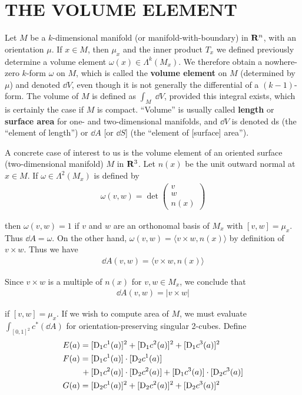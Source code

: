 \clearpage
\section{THE VOLUME ELEMENT}
Let $M$ be a $k$-dimensional manifold (or manifold-with-boundary) in $\mathbf{R}^n$, 
with an orientation $\mu$. If $x\in M$, then $\mu_x$ and the inner product $T_x$ we defined 
previously determine a volume element $\omega(x) \in \Lambda^k(M_x)$. We therefore obtain a 
nowhere-zero $k$-form $\omega$ on $M$, which is called the \textbf{volume element} on $M$ 
(determined by $\mu$) and denoted $\dd V$, even though it is not generally the differential 
of a $(k-1)$-form. The volume of $M$ is defined as $\int_M \;\dd V$, provided this integral 
exists, which is certainly the case if $M$ is compact. ``Volume'' is usually called \textbf{length} or 
\textbf{surface area} for one- and two-dimensional manifolds, and $\dd V$ is denoted ds 
(the ``element of length'') or $\dd A$ [or $\dd S$] (the ``element of [surface] area'').

A concrete case of interest to us is the volume element of an oriented surface 
(two-dimensional manifold) $M$ in $\mathbf{R}^3$. Let $n(x)$ be the unit outward normal at
$x\in M$. If $\omega\in \Lambda^2(M_x)$ is defined by 
\begin{align*}
    \omega(v, w) = \det \begin{pmatrix}v\\ w\\ n(x)\end{pmatrix}
\end{align*} 

then $\omega(v,w)=1$ if $v$ and $w$ are an orthonomal basis of $M_x$ with $[v, w]=\mu_x$. 
Thus $\dd A=\omega$. On the other hand, $\omega(v, w)=\langle v\times w, n(x)\rangle$ by definition
of $v\times w$. Thus we have 
\begin{align*}
    \dd A(v, w) = \langle v\times w, n(x)\rangle
\end{align*}

Since $v\times w$ is a multiple of $n(x)$ for $v,w\in M_x$, we conclude that 
\begin{align*}
    \dd A(v, w) = |v\times w|
\end{align*} 

if $[v, w]=\mu_x$. If we wish to compute area of $M$, we must evaluate $\int_{[0,1]^2} c^*(\dd A)$ for 
orientation-preserving singular 2-cubes. Define 
\begin{align*}
    & E(a) = [\mathrm{D}_1c^1(a)]^2 + [\mathrm{D}_1c^2(a)]^2 + [\mathrm{D}_1c^3(a)]^2\\
    & F(a) = [\mathrm{D}_1c^1(a)]\cdot[\mathrm{D}_2c^1(a)] \\
    & \hspace*{2.2em} + [\mathrm{D}_1c^2(a)]\cdot[\mathrm{D}_2c^2(a)] + [\mathrm{D}_1c^3(a)]\cdot[\mathrm{D}_2c^3(a)]\\
    & G(a) = [\mathrm{D}_2c^1(a)]^2 + [\mathrm{D}_2c^2(a)]^2 + [\mathrm{D}_2c^3(a)]^2
\end{align*}

